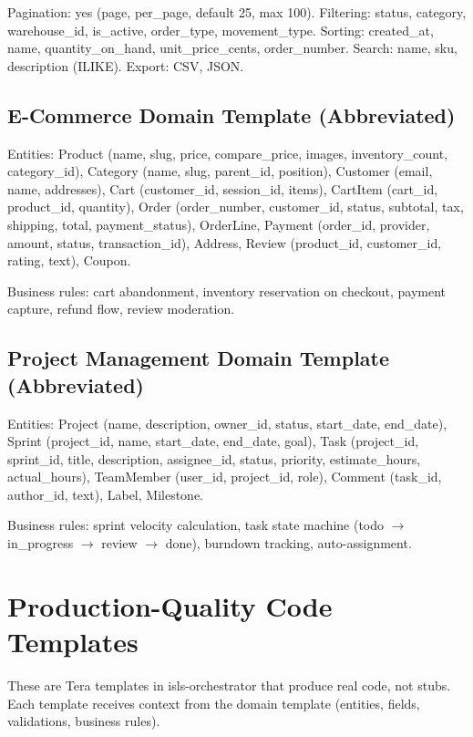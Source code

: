 \documentclass[11pt,a4paper]{article}
\begin{document}
Pagination: yes (page, per\_page, default 25, max 100).
Filtering: status, category, warehouse\_id, is\_active, order\_type, movement\_type.
Sorting: created\_at, name, quantity\_on\_hand, unit\_price\_cents, order\_number.
Search: name, sku, description (ILIKE).
Export: CSV, JSON.

\subsection{E-Commerce Domain Template (Abbreviated)}

Entities: Product (name, slug, price, compare\_price, images, inventory\_count,
category\_id), Category (name, slug, parent\_id, position), Customer (email,
name, addresses), Cart (customer\_id, session\_id, items), CartItem (cart\_id,
product\_id, quantity), Order (order\_number, customer\_id, status, subtotal,
tax, shipping, total, payment\_status), OrderLine, Payment (order\_id, provider,
amount, status, transaction\_id), Address, Review (product\_id, customer\_id,
rating, text), Coupon.

Business rules: cart abandonment, inventory reservation on checkout, payment
capture, refund flow, review moderation.

\subsection{Project Management Domain Template (Abbreviated)}

Entities: Project (name, description, owner\_id, status, start\_date, end\_date),
Sprint (project\_id, name, start\_date, end\_date, goal), Task (project\_id,
sprint\_id, title, description, assignee\_id, status, priority, estimate\_hours,
actual\_hours), TeamMember (user\_id, project\_id, role), Comment (task\_id,
author\_id, text), Label, Milestone.

Business rules: sprint velocity calculation, task state machine (todo $\to$
in\_progress $\to$ review $\to$ done), burndown tracking, auto-assignment.

\section{Production-Quality Code Templates}

These are Tera templates in isls-orchestrator that produce real code, not stubs.
Each template receives context from the domain template (entities, fields,
validations, business rules).
\end{document}
